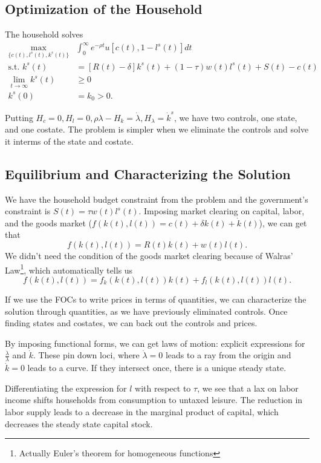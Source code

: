 \documentclass{tufte-handout}
\theoremstyle{definition}
\begin{document}
\subsection{Optimization of the Household}
The household solves 
\begin{align*}
	\max_{\{c(t), l^s(t), k^s(t)\}} &\int_{0}^{\infty} e^{-\rho t}u\left[ c(t), 1- l^s(t) \right] dt \\
	\text{s.t. } k^s(t) &= [R(t)-\delta]k^s(t) + (1-\tau)w(t) l^s(t) + S(t) - c(t) \\
	\lim\limits_{t \to \infty} k^s(t) &\ge 0 \\
	k^s(0) &= k_0 > 0
.\end{align*}

Putting $H_c = 0, H_l =0, \rho \lambda-H_k = \dot{\lambda}, H_\lambda = \dot{k}^s$, we have two controls, one state, and one costate. The problem is simpler when we eliminate the controls and solve it interms of the state and costate.

\subsection{Equilibrium and Characterizing the Solution}
We have the household budget constraint from the problem and the government's constraint is $S(t) = \tau w(t)l^s(t)$. Imposing market clearing on capital, labor, and the goods market ($f(k(t),l(t)) = c(t) + \delta k(t) + \dot{k}(t)$), we can get that \[
	f(k(t),l(t)) = R(t)k(t) + w(t)l(t) 
.\] We didn't need the condition of the goods market clearing because of Walras' Law\footnote{Actually Euler's theorem for homogeneous functions}, which automatically tells us \[
	f(k(t),l(t)) = f_k(k(t),l(t))k(t) + f_l(k(t),l(t))l(t)
.\] 

If we use the FOCs to write prices in terms of quantities, we can characterize the solution through quantities, as we have previously eliminated controls. Once finding states and costates, we can back out the controls and prices.

By imposing functional forms, we can get laws of motion: explicit expressions for $\frac{\dot{\lambda}}{\lambda}$ and $\dot{k}$. These pin down loci, where $\dot{\lambda} = 0$ leads to a ray from the origin and $\dot{k} = 0$ leads to a curve. If they intersect once, there is a unique steady state. 

Differentiating the expression for $l$ with respect to $\tau$, we see that a lax on labor income shifts households from consumption to untaxed leisure. The reduction in labor supply leads to a decrease in the marginal product of capital, which decreases the steady state capital stock. 
\end{document}
